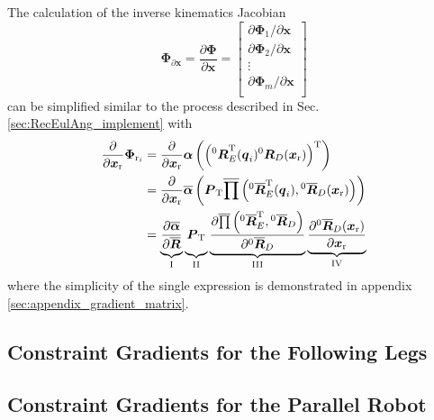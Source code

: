 \documentclass[robotics,article,submit,moreauthors,pdftex]{Definitions/mdpi}
\newcommand{\bm}[1]{\boldsymbol{#1}}
\newcommand{\rotmat}[2]{{{ }^{#1}\boldsymbol{R}}_{#2}}
\newcommand{\rotmato}[2]{{{ }^{#1}\boldsymbol{\overline{R}}}_{#2}}
\newcommand{\transp}[0]{{\mathrm{T}}}
\begin{document}
The calculation of the inverse kinematics Jacobian
%
\begin{equation}
\bm{\Phi}_{\partial \bm{x}}
=
\frac{\partial \bm{\Phi}}{\partial \bm{x}}
=
\begin{bmatrix}
\partial \bm{\Phi}_1/\partial \bm{x}\\
\partial \bm{\Phi}_2/\partial \bm{x}\\
\vdots \\
\partial \bm{\Phi}_m/\partial \bm{x}\\
\end{bmatrix}
\label{equ:PKM_phi_grad_x_doppelt}
\end{equation}  
%
can be simplified similar to the process described in Sec.\,\ref{sec:RecEulAng_implement} with
%
\begin{align}
\frac{\partial}{\partial \bm{x}_{\mathrm{r}}}\bm{\Phi}_{\mathrm{r}_i}
&=
\frac{\partial}{\partial \bm{x}_{\mathrm{r}}} \bm{\alpha}\left(\left(\rotmat{0}{E}^\transp(\bm{q}_i) \rotmat{0}{D}(\bm{x}_{\mathrm{r}})\right)^\transp\right) \label{equ:grad_Phi_x} \\
&=
\frac{\partial}{\partial \bm{x}_{\mathrm{r}}} \overline{\bm{\alpha}}\left(
\bm{P}_{\mathrm{T}}
\overline{\prod}\left( \rotmato{0}{E}^\transp(\bm{q}_i), \rotmato{0}{D}(\bm{x}_{\mathrm{r}})\right)\right) \nonumber \\
&=
\underbrace{\vphantom{\frac{\partial \overline{\prod}\left( \rotmato{0}{E}^\transp, \rotmato{0}{D}\right)}{\partial \rotmato{0}{D}}}
    \frac{\partial \overline{\bm{\alpha}}}{\partial \overline{\bm{R}}}}_{\mathrm{I}}
\underbrace{\vphantom{\frac{\partial \overline{\prod}\left( \rotmato{0}{E}^\transp, \rotmato{0}{D}\right)}{\partial \rotmato{0}{D}}}
    \bm{P}_{\mathrm{T}}}_{\mathrm{II}}
\underbrace{\frac{\partial \overline{\prod}\left( \rotmato{0}{E}^\transp, \rotmato{0}{D}\right)}{\partial \rotmato{0}{D}}}_{\mathrm{III}}
\underbrace{\frac{\partial \rotmato{0}{D}(\bm{x}_{\mathrm{r}})}{\partial \bm{x}_{\mathrm{r}}}}_{\mathrm{IV}} \nonumber
\end{align}
%
where the simplicity of the single expression is demonstrated in appendix\,\ref{sec:appendix_gradient_matrix}.

\subsection{Constraint Gradients for the Following Legs}


\subsection{Constraint Gradients for the Parallel Robot}
\end{document}
